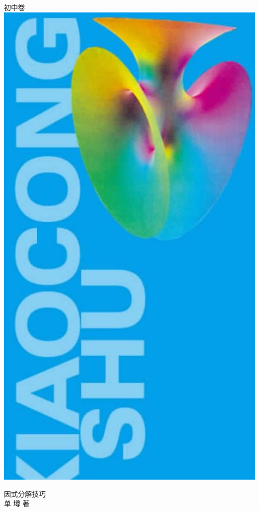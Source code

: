 \documentclass[10pt]{article}
\begin{document}
初中卷\\
\includegraphics[max width=\textwidth, center]{2024_10_30_bd799899fef40368a068g-001(1)}

因式分解技巧\\
单 墫 著
\end{document}
